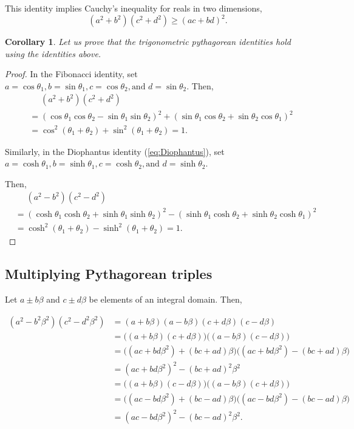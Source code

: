 \documentclass{article}
\newtheorem{corollary}{Corollary}
\theoremstyle{definition}
\begin{document}
This identity implies Cauchy's inequality for reals in two dimensions, \[ (a^2+b^2)(c^2+d^2)\ge (ac+bd)^2. \]

\begin{corollary}
Let us prove that the trigonometric pythagorean identities hold using the identities above.
\end{corollary}
\begin{proof}
In the Fibonacci identity, set \(a = \cos \theta_1, b = \sin \theta_1, c = \cos \theta_2, \text{and } d = \sin \theta_2\). Then,
\[\begin{aligned}
&\phantom{=} (a^2+b^2) (c^2+d^2) \\ &= (\cos\theta_1\cos\theta_2-\sin\theta_1\sin\theta_2)^2 +(\sin\theta_1\cos\theta_2+\sin\theta_2\cos\theta_1)^2 \\ &= \cos^2(\theta_1+\theta_2)+\sin^2(\theta_1+\theta_2) = 1. 
\end{aligned} \]

Similarly, in the Diophantus identity (\ref{eq:Diophantus}), set \(a = \cosh \theta_1, b = \sinh \theta_1, c = \cosh \theta_2, \text{and } d = \sinh \theta_2\).

Then,
\[\begin{aligned}
&\phantom{=} (a^2-b^2) (c^2-d^2) \\ &= (\cosh\theta_1\cosh\theta_2+\sinh\theta_1\sinh\theta_2)^2 -(\sinh\theta_1\cosh\theta_2+\sinh\theta_2\cosh\theta_1)^2 \\ &= \cosh^2(\theta_1+\theta_2)-\sinh^2(\theta_1+\theta_2) = 1.
\end{aligned} \]
\end{proof}

\subsection{Multiplying Pythagorean triples}

Let \(a\pm b\beta\) and \(c\pm d\beta\) be elements of an integral domain. Then,

\[\begin{aligned}
(a^2-b^2\beta^2) (c^2-d^2\beta^2) &= (a+b\beta)(a-b\beta)(c+d\beta)(c-d\beta) \\ &= \big((a+b\beta)(c+d\beta)\big) \big((a-b\beta)(c-d\beta)\big) \\ &= \big((ac+bd\beta^2)+(bc+ad)\beta\big) \big((ac+bd\beta^2)-(bc+ad)\beta\big) \\ &= \boxed{(ac+bd\beta^2)^2-(bc+ad)^2\beta^2} \\ &= \big((a+b\beta)(c-d\beta)\big) \big((a-b\beta)(c+d\beta)\big) \\ &= \big((ac-bd\beta^2)+(bc-ad)\beta\big)\big((ac-bd\beta^2)-(bc-ad)\beta \big) \\ &= \boxed{(ac-bd\beta^2)^2-(bc-ad)^2\beta^2}.
\end{aligned}\]
\end{document}
